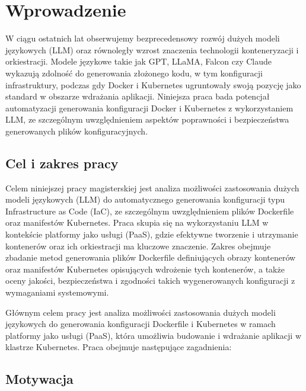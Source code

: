 \clearpage %
\section{Wprowadzenie}

W ciągu ostatnich lat obserwujemy bezprecedensowy rozwój dużych modeli językowych (LLM) oraz równoległy wzrost znaczenia technologii konteneryzacji i orkiestracji. Modele językowe takie jak GPT, LLaMA, Falcon czy Claude wykazują zdolność do generowania złożonego kodu, w tym konfiguracji infrastruktury, podczas gdy Docker i Kubernetes ugruntowały swoją pozycję jako standard w obszarze wdrażania aplikacji. Niniejsza praca bada potencjał automatyzacji generowania konfiguracji Docker i Kubernetes z wykorzystaniem LLM, ze szczególnym uwzględnieniem aspektów poprawności i bezpieczeństwa generowanych plików konfiguracyjnych.

\subsection{Cel i zakres pracy}

Celem niniejszej pracy magisterskiej jest analiza możliwości zastosowania dużych modeli językowych (LLM) do automatycznego generowania konfiguracji typu Infrastructure as Code (IaC), ze szczególnym uwzględnieniem plików Dockerfile oraz manifestów Kubernetes. Praca skupia się na wykorzystaniu LLM w kontekście platformy jako usługi (PaaS), gdzie efektywne tworzenie i utrzymanie kontenerów oraz ich orkiestracji ma kluczowe znaczenie. Zakres obejmuje zbadanie metod generowania plików Dockerfile definiujących obrazy kontenerów oraz manifestów Kubernetes opisujących wdrożenie tych kontenerów, a także oceny jakości, bezpieczeństwa i zgodności takich wygenerowanych konfiguracji z wymaganiami systemowymi.

Głównym celem pracy jest analiza możliwości zastosowania dużych modeli językowych do generowania konfiguracji Dockerfile i Kubernetes w ramach platformy jako usługi (PaaS), która umożliwia budowanie i wdrażanie aplikacji w klastrze Kubernetes. Praca obejmuje następujące zagadnienia:

\subsection{Motywacja}


